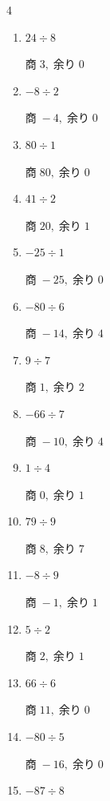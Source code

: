 \begin{multicols}{4}
\begin{enumerate}
        $商\; 14,\; 余り\; 0$

  \item $24 \div 8$

        $商\; 3,\; 余り\; 0$

  \item $-8 \div 2$

        $商\; -4,\; 余り\; 0$

  \item $80 \div 1$

        $商\; 80,\; 余り\; 0$

  \item $41 \div 2$

        $商\; 20,\; 余り\; 1$

  \item $-25 \div 1$

        $商\; -25,\; 余り\; 0$

  \item $-80 \div 6$

        $商\; -14,\; 余り\; 4$

  \item $9 \div 7$

        $商\; 1,\; 余り\; 2$

\columnbreak %

  \item $-66 \div 7$

        $商\; -10,\; 余り\; 4$

  \item $1 \div 4$

        $商\; 0,\; 余り\; 1$

  \item $79 \div 9$

        $商\; 8,\; 余り\; 7$

  \item $-8 \div 9$

        $商\; -1,\; 余り\; 1$

  \item $5 \div 2$

        $商\; 2,\; 余り\; 1$

  \item $66 \div 6$

        $商\; 11,\; 余り\; 0$

  \item $-80 \div 5$

        $商\; -16,\; 余り\; 0$

  \item $-87 \div 8$


\end{enumerate}
\end{multicols}
